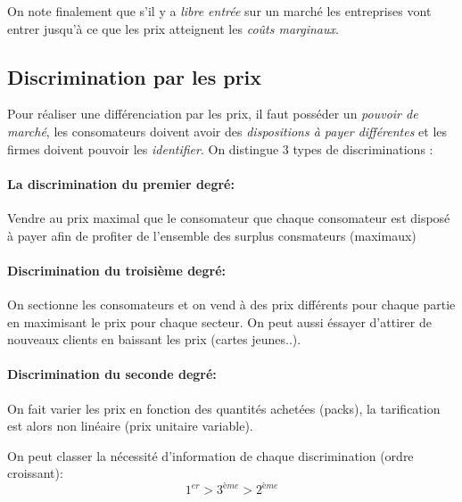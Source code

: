 On note finalement que s'il y a \emph{libre entrée} sur un marché 
les entreprises vont entrer jusqu'à ce que les prix atteignent les \emph{coûts marginaux}.

\subsection{Discrimination par les prix} %
\label{sub:discrimination_par_les_prix}
 Pour réaliser une différenciation par les prix, il faut posséder un \emph{pouvoir de marché},
 les consomateurs doivent avoir des \emph{dispositions à payer différentes} 
 et les firmes doivent pouvoir les \emph{identifier}. 
 On distingue 3 types de discriminations : 
 
 \paragraph{La discrimination du premier degré:} %
 \label{par:la_discrimination_du_premier_degre}
 Vendre au prix maximal que le consomateur que chaque consomateur est disposé 
 à payer afin de profiter de l'ensemble des surplus consmateurs (maximaux) 
 
 
 \paragraph{Discrimination du troisième degré:} %
 \label{par:discrimination_du_troisieme_degre}
 On sectionne les consomateurs et on vend à des prix différents pour chaque partie 
 en maximisant le prix pour chaque secteur. On peut aussi éssayer d'attirer de nouveaux 
 clients en baissant les prix (cartes jeunes..).
 
 \paragraph{Discrimination du seconde degré:} %
 \label{par:discrimination_du_seconde_degre}
 On fait varier les prix en fonction des quantités achetées (packs), 
 la tarification est alors non linéaire (prix unitaire variable).
 


On peut classer la nécessité d'information de chaque discrimination (ordre croissant):
\[
	1^{er} > 3^{ème} > 2^{ème}
\]

